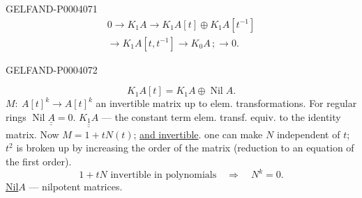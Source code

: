 \begin{GelfandAdjacentEvidence}{GELFAND-P000407}{1}
\begingroup\color{black}\begin{equation*}
\begin{aligned}
0\longrightarrow K_1A\longrightarrow K_1A[t]\oplus K_1A[t^{-1}]\\
{}\longrightarrow K_1A[t, t^{-1}]\longrightarrow K_0A\,;\longrightarrow0.
\end{aligned}
\end{equation*}\endgroup
{}
\end{GelfandAdjacentEvidence}
\begin{GelfandAdjacentEvidence}{GELFAND-P000407}{2}


\begingroup\color{black}\begin{equation*}
K_1A[t]=K_1A\oplus\operatorname{Nil}A.
\end{equation*}\endgroup
$M:\ A[t]^k\longrightarrow A[t]^k$ an invertible matrix up to elem. transformations.
For regular rings $\underline{\underline{\operatorname{Nil}A=0}}$.
$\underline{\underline{K_1A}}$ — the constant term elem. transf. equiv. to the identity matrix.
Now $M=1+tN (t)$; \underline{and invertible}.
one can make $N$ independent of $t$; $t^2$ is broken up by increasing the order of the matrix
(reduction to an equation of the first order).
\begingroup\color{black}\begin{equation*}
1+tN\text{ invertible in polynomials}\quad\Longrightarrow\quad N^k=0.
\end{equation*}\endgroup
\underline{Nil}$A$ — nilpotent matrices.
\end{GelfandAdjacentEvidence}
